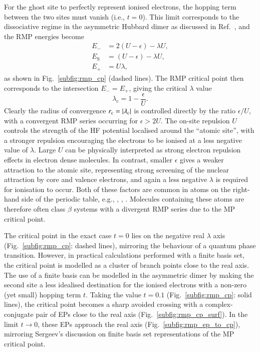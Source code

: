 \documentclass[aps,prb,reprint,noshowkeys,superscriptaddress]{revtex4-1}
\newcommand{\latin}[1]{#1}
\newcommand{\ie}{\latin{i.e.}}
\newcommand{\eg}{\latin{e.g.}}
\newcommand{\rc}{r_{\text{c}}}
\newcommand{\lc}{\lambda_{\text{c}}}
\begin{document}
For the ghost site to perfectly represent ionised electrons, the hopping term between the two sites must vanish (\ie, $t=0$).
This limit corresponds to the dissociative regime in the asymmetric Hubbard dimer as discussed in Ref.~, 
and the RMP energies become
\begin{subequations}
\begin{align}
    E_{-} &= 2(U - \epsilon) - \lambda U,
    \\
    E_{\text{S}} &= (U - \epsilon) - \lambda U,
    \\ 
    E_{+} &= U \lambda,
\end{align}
\end{subequations}
as shown in Fig.~\ref{subfig:rmp_cp} (dashed lines).
The RMP critical point then corresponds to the intersection $E_{-} = E_{+}$, giving the critical $\lambda$ value
\begin{equation}
    \lc = 1 - \frac{\epsilon}{U}. 
\end{equation}
Clearly the radius of convergence $\rc = \abs{\lc}$ is controlled directly by the ratio $\epsilon / U$, 
with a convergent RMP series occurring for $\epsilon > 2 U$.
The on-site repulsion $U$ controls the strength of the HF potential localised around the ``atomic site'', with a
stronger repulsion encouraging the electrons to be ionised at a less negative value of $\lambda$. 
Large $U$ can be physically interpreted as strong electron repulsion effects in electron dense molecules. 
In contrast, smaller $\epsilon$ gives a weaker attraction to the atomic site, 
representing strong screening of the nuclear attraction by core and valence electrons, 
and again a less negative $\lambda$ is required for ionisation to occur.
Both of these factors are common in atoms on the right-hand side of the periodic table, \eg, ,
, .
Molecules containing these atoms are therefore often class $\beta$ systems with
a divergent RMP series due to the MP critical point. \cite{Goodson_2004,Sergeev_2006} 

The critical point in the exact case $t=0$ lies on the negative real $\lambda$ axis (Fig.~\ref{subfig:rmp_cp}: dashed lines), 
mirroring the behaviour of a quantum phase transition.\cite{Kais_2006}
However, in practical calculations performed with a finite basis set, the critical point is modelled as a cluster
of branch points close to the real axis.
The use of a finite basis can be modelled in the asymmetric dimer by making the second site a less
idealised destination for the ionised electrons with a non-zero (yet small) hopping term $t$.
Taking the value $t=0.1$ (Fig.~\ref{subfig:rmp_cp}: solid lines), the critical point becomes a
sharp avoided crossing with a complex-conjugate pair of EPs close to the real axis (Fig.~\ref{subfig:rmp_cp_surf}).
In the limit $t \to 0$, these EPs approach the real axis (Fig.~\ref{subfig:rmp_ep_to_cp}),
mirroring Sergeev's discussion on finite basis
set representations of the MP critical point.\cite{Sergeev_2006}
\end{document}
